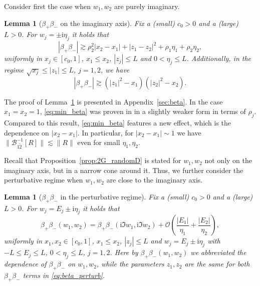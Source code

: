 \documentclass[10pt]{amsart}
\newtheorem{lemma}[theorem]{Lemma}
\numberwithin{equation}{section}
\newcommand{\ii}{\mathrm{i}}
\begin{document}
Consider first the case when $w_1,w_2$ are purely imaginary.

\begin{lemma}[$\beta_+\beta_-$ on the imaginary axis]\label{lem:beta} Fix a (small) $c_0>0$ and a (large) $L>0$. For $w_j=\pm\ii\eta_j$ it holds that
\begin{equation}
|\beta_+\beta_-|\gtrsim \rho_2^2|x_2-x_1|+|z_1-z_2|^2 +\rho_1\eta_1 +\rho_2\eta_2,
\label{eq:min_beta}
\end{equation}
uniformly in $x_j\in [c_0,1]$, $x_1\le x_2$, $|z_j|\le L$ and $0<\eta_j\le L$. Additionally, in the regime $\sqrt{x_j}\le |z_1|\le L$, $j=1,2$, we have
\begin{equation}
|\beta_+\beta_-|\gtrsim \left(|z_1|^2-x_1\right)\left(|z_2|^2-x_2\right).
\label{eq:min_beta_outside}
\end{equation}
\end{lemma}

The proof of Lemma~\ref{lem:beta} is presented in Appendix~\ref{sec:beta}. In the case $x_1=x_2=1$, \eqref{eq:min_beta} was proven in \cite[Lemma~6.1]{macroCLT_complex} in a slightly weaker form in terms of $\rho_j$. Compared to this result, \eqref{eq:min_beta} features a new effect, which is the dependence on $|x_2-x_1|$. In particular, for $|x_2-x_1|\sim 1$ we have $\|\mathcal{B}_{1\widetilde{2}}^{-1}[R]\|\lesssim \|R\|$ even for small $\eta_1,\eta_2$.

Recall that Proposition~\ref{prop:2G_randomD} is stated for $w_1,w_2$ not only on the imaginary axis, but in a narrow cone around it. Thus, we further consider the perturbative regime when $w_1,w_2$ are close to the imaginary axis.

\begin{lemma}[$\beta_+\beta_-$ in the perturbative regime]\label{lem:beta_perturb} Fix a (small) $c_0>0$ and a (large) $L>0$. For $w_j=E_j\pm\ii\eta_j$ it holds that 
\begin{equation}
\beta_+\beta_-(w_1,w_2) = \beta_+\beta_-(\ii\Im w_1,\ii\Im w_2) +\mathcal{O}\left(\frac{|E_1|}{\eta_1}+\frac{|E_2|}{\eta_2}\right),
\label{eq:beta_perturb}
\end{equation}
uniformly in $x_1,x_2\in [c_0,1]$, $x_1\le x_2$, $|z_j|\le L$ and $w_j=E_j\pm\ii\eta_j$ with $-L\le E_j\le L$, $0<\eta_j\le L$, $j=1,2$. Here by $\beta_+\beta_-(w_1,w_2)$ we abbreviated the dependence of $\beta_+\beta_-$ on $w_1,w_2$, while the parameters $z_1,z_2$ are the same for both $\beta_+\beta_-$ terms in \eqref{eq:beta_perturb}.
\end{lemma}
\end{document}
